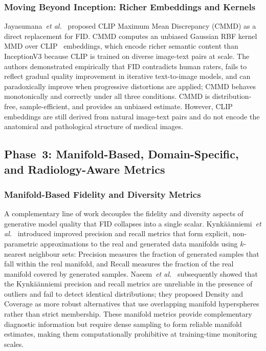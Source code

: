 \documentclass[lettersize,journal]{IEEEtran}
\begin{document}
\subsubsection{Moving Beyond Inception: Richer Embeddings and Kernels}
\label{sec:related_beyond}

Jayasumana~\textit{et al.}~\cite{jayasumana2024cmmd} proposed CLIP
Maximum Mean Discrepancy (CMMD) as a direct replacement for FID. CMMD computes
an unbiased Gaussian RBF kernel MMD over CLIP~\cite{radford2021clip}
embeddings, which encode richer semantic content than InceptionV3 because
CLIP is trained on diverse image-text pairs at scale. The authors
demonstrated empirically that FID contradicts human raters, fails to reflect
gradual quality improvement in iterative text-to-image models, and can
paradoxically improve when progressive distortions are applied; CMMD behaves
monotonically and correctly under all three conditions. CMMD is
distribution-free, sample-efficient, and provides an unbiased estimate.
However, CLIP embeddings are still derived from natural image-text pairs and
do not encode the anatomical and pathological structure of medical images.

\subsection{Phase~3: Manifold-Based, Domain-Specific, and Radiology-Aware Metrics}
\label{sec:related_phase3}

\subsubsection{Manifold-Based Fidelity and Diversity Metrics}
\label{sec:related_manifold}

A complementary line of work decouples the fidelity and diversity aspects
of generative model quality that FID collapses into a single scalar.
Kynk\"{a}\"{a}nniemi~\textit{et al.}~\cite{kynkaanniemi2019pr} introduced
improved precision and recall metrics that form explicit, non-parametric
approximations to the real and generated data manifolds using $k$-nearest
neighbour sets: Precision measures the fraction of generated samples that
fall within the real manifold, and Recall measures the fraction of the real
manifold covered by generated samples.
Naeem~\textit{et al.}~\cite{naeem2020dc} subsequently showed that the
Kynk\"{a}\"{a}nniemi precision and recall metrics are unreliable in the
presence of outliers and fail to detect identical distributions; they
proposed Density and Coverage as more robust alternatives that use
overlapping manifold hyperspheres rather than strict membership. These
manifold metrics provide complementary diagnostic information but require
dense sampling to form reliable manifold estimates, making them
computationally prohibitive at training-time monitoring scales.
\end{document}

